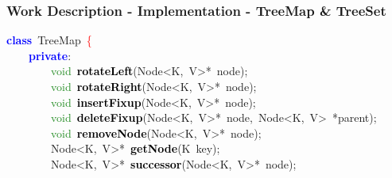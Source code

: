 \documentclass[table, usenames,dvipsnames,svgnames]{beamer}
\begin{document}
\begin{frame}

\frametitle{Work Description - Implementation - TreeMap \& TreeSet}




\pause
\vspace{-4mm}
\begin{center}\begin{minipage}{90mm}
\begin{block}
\noindent
\mbox{}\textbf{\textcolor{Blue}{class}}\ \textcolor{TealBlue}{TreeMap}\ \textcolor{Red}{\{} \\
\mbox{}\ \ \ \ \textbf{\textcolor{Blue}{private}}\textcolor{BrickRed}{:} \\
\mbox{}\ \ \ \ \ \ \ \ \textcolor{ForestGreen}{void}\ \textbf{\textcolor{Black}{rotateLeft}}\textcolor{BrickRed}{(}Node\textcolor{BrickRed}{\textless{}}K\textcolor{BrickRed}{,}\ V\textcolor{BrickRed}{\textgreater{}*}\ node\textcolor{BrickRed}{);} \\
\mbox{}\ \ \ \ \ \ \ \ \textcolor{ForestGreen}{void}\ \textbf{\textcolor{Black}{rotateRight}}\textcolor{BrickRed}{(}Node\textcolor{BrickRed}{\textless{}}K\textcolor{BrickRed}{,}\ V\textcolor{BrickRed}{\textgreater{}*}\ node\textcolor{BrickRed}{);} \\
\mbox{}\ \ \ \ \ \ \ \ \textcolor{ForestGreen}{void}\ \textbf{\textcolor{Black}{insertFixup}}\textcolor{BrickRed}{(}Node\textcolor{BrickRed}{\textless{}}K\textcolor{BrickRed}{,}\ V\textcolor{BrickRed}{\textgreater{}*}\ node\textcolor{BrickRed}{);} \\
\mbox{}\ \ \ \ \ \ \ \ \textcolor{ForestGreen}{void}\ \textbf{\textcolor{Black}{deleteFixup}}\textcolor{BrickRed}{(}\textcolor{TealBlue}{Node\textless{}K,\ V\textgreater{}*\ node,\ Node\textless{}K,\ V\textgreater{}}\ \textcolor{BrickRed}{*}parent\textcolor{BrickRed}{);} \\
\mbox{}\ \ \ \ \ \ \ \ \textcolor{ForestGreen}{void}\ \textbf{\textcolor{Black}{removeNode}}\textcolor{BrickRed}{(}Node\textcolor{BrickRed}{\textless{}}K\textcolor{BrickRed}{,}\ V\textcolor{BrickRed}{\textgreater{}*}\ node\textcolor{BrickRed}{);} \\
\mbox{}\ \ \ \ \ \ \ \ Node\textcolor{BrickRed}{\textless{}}K\textcolor{BrickRed}{,}\ V\textcolor{BrickRed}{\textgreater{}*}\ \textbf{\textcolor{Black}{getNode}}\textcolor{BrickRed}{(}\textcolor{TealBlue}{K}\ key\textcolor{BrickRed}{);} \\
\mbox{}\ \ \ \ \ \ \ \ Node\textcolor{BrickRed}{\textless{}}K\textcolor{BrickRed}{,}\ V\textcolor{BrickRed}{\textgreater{}*}\ \textbf{\textcolor{Black}{successor}}\textcolor{BrickRed}{(}Node\textcolor{BrickRed}{\textless{}}K\textcolor{BrickRed}{,}\ V\textcolor{BrickRed}{\textgreater{}*}\ node\textcolor{BrickRed}{);} 
\end{block}
\end{minipage}\end{center}


\end{frame}
\end{document}
